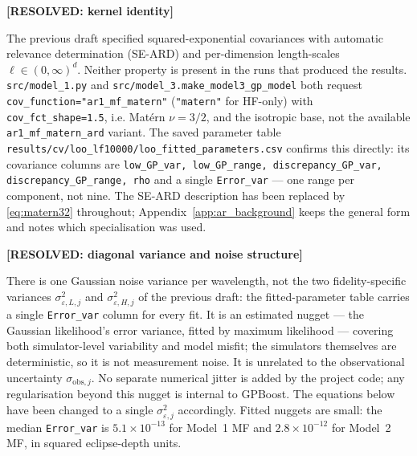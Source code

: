 \documentclass[12pt, letterpaper, oneside]{article}
\newcommand{\resolved}[2]{\par\begingroup\small\color{green!35!black}%
\noindent\textbf{[RESOLVED: #1]}\par\nobreak\noindent #2\par\endgroup}
\begin{document}
\resolved{kernel identity}{The previous draft specified squared-exponential
covariances with automatic relevance determination (SE-ARD) and
per-dimension length-scales $\bm\ell\in(0,\infty)^d$. Neither property is
present in the runs that produced the results. \texttt{src/model\_1.py} and
\texttt{src/model\_3.make\_model3\_gp\_model} both request
\texttt{cov\_function="ar1\_mf\_matern"} (\texttt{"matern"} for HF-only) with
\texttt{cov\_fct\_shape=1.5}, i.e. Matérn $\nu=3/2$, and the isotropic base,
not the available \texttt{ar1\_mf\_matern\_ard} variant. The saved parameter
table \texttt{results/cv/loo\_lf10000/loo\_fitted\_parameters.csv} confirms
this directly: its covariance columns are
\texttt{low\_GP\_var, low\_GP\_range, discrepancy\_GP\_var,
discrepancy\_GP\_range, rho} and a single \texttt{Error\_var} --- one range
per component, not nine. The SE-ARD description has been replaced by
\eqref{eq:matern32} throughout; Appendix~\ref{app:ar_background} keeps the
general form and notes which specialisation was used.}

\resolved{diagonal variance and noise structure}{There is one Gaussian noise
variance per wavelength, not the two fidelity-specific variances
$\sigma^2_{\varepsilon,L,j}$ and $\sigma^2_{\varepsilon,H,j}$ of the previous
draft: the fitted-parameter table carries a single \texttt{Error\_var} column
for every fit. It is an estimated nugget --- the Gaussian likelihood's error
variance, fitted by maximum likelihood --- covering both simulator-level
variability and model misfit; the simulators themselves are deterministic, so
it is not measurement noise. It is unrelated to the observational uncertainty
$\sigma_{\mathrm{obs},j}$. No separate numerical jitter is added by the
project code; any regularisation beyond this nugget is internal to GPBoost.
The equations below have been changed to a single $\sigma^2_{\varepsilon,j}$
accordingly. Fitted nuggets are small: the median \texttt{Error\_var} is
$5.1\times10^{-13}$ for Model~1 MF and $2.8\times10^{-12}$ for Model~2 MF, in
squared eclipse-depth units.}
\end{document}
